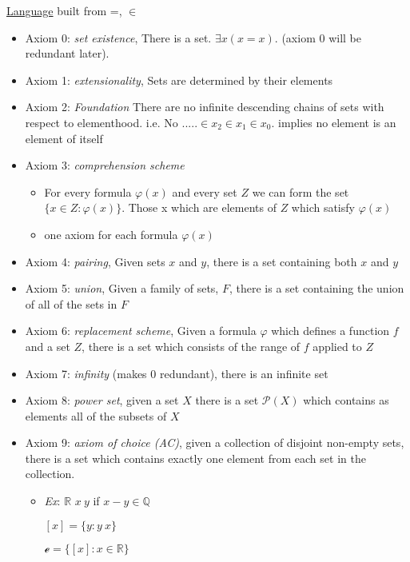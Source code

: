 \documentclass{article}
\begin{document}
    \underline{Language} built from =, $\in$
    \begin{itemize}
        \item Axiom 0: \emph{set existence}, There is a set. $\exists x (x=x)$. (axiom 0 will be redundant later).
        \item Axiom 1: \emph{extensionality}, Sets are determined by their elements
        \item Axiom 2: \emph{Foundation} There are no infinite descending chains of sets with respect to elementhood. i.e. No $..... \in x_2 \in x_1 \in x_0$. implies no element is an element of itself
        \item Axiom 3: \emph{comprehension scheme}
        \begin{itemize}
            \item For every formula $\varphi(x)$ and every set $Z$ we can form the set $\{x \in Z : \varphi(x)\}$.
            Those x which are elements of $Z$ which satisfy $\varphi(x)$
            \item one axiom for each formula $\varphi(x)$
        \end{itemize}
        \item Axiom 4: \emph{pairing}, Given sets $x$ and $y$, there is a set containing both $x$ and $y$
        \item Axiom 5: \emph{union}, Given a family of sets, $F$, there is a set containing the union of all of the sets in $F$
        \item Axiom 6: \emph{replacement scheme}, Given a formula $\varphi$ which defines a function $f$ and a set $Z$, there is a set which consists of the range of $f$ applied to $Z$
        \item Axiom 7: \emph{infinity} (makes 0 redundant), there is an infinite set
        \item Axiom 8: \emph{power set}, given a set $X$ there is a set $\mathcal{P}(X)$ which contains as elements all of the subsets of $X$
        \item Axiom 9: \emph{axiom of choice (AC)}, given a collection of disjoint non-empty sets, there is a set which contains exactly one element from each set in the collection.
        \begin{itemize}
            \item \emph{Ex}: $\mathbb{R}$ $x~y$ if $x-y \in \mathbb{Q}$

            $[x] = \{y: y~x\}$

            $\mathcal{e}=\{[x]: x \in \mathbb{R} \}$


\end{itemize}
\end{itemize}
\end{document}
